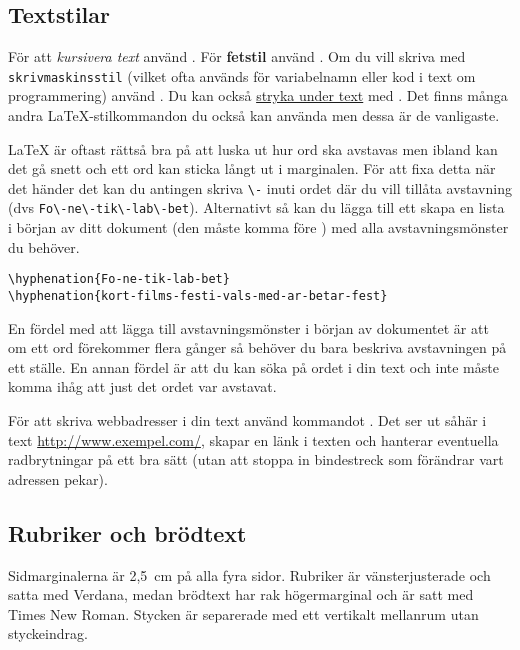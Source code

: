 
\subsection{Textstilar}

För att \emph{kursivera text} använd . För \textbf{fetstil}
använd . Om du vill skriva med \texttt{skriv\-maskins\-stil}
(vilket ofta används för variabelnamn eller kod i text om programmering) använd
. Du kan också \underline{stryka under text} med
. Det finns många andra \LaTeX{}-stilkommandon du också
kan använda men dessa är de vanligaste.

\LaTeX{} är oftast rättså bra på att luska ut hur ord ska avstavas men ibland
kan det gå snett och ett ord kan sticka långt ut i marginalen. För att fixa
detta när det händer det kan du antingen skriva \verb|\-| inuti ordet där du
vill tillåta avstavning (dvs \verb|Fo\-ne\-tik\-lab\-bet|). Alternativt så kan
du lägga till ett skapa en lista i början av ditt dokument (den måste komma
före \verb||) med alla avstavningsmönster du behöver.

\begin{verbatim}
\hyphenation{Fo-ne-tik-lab-bet}
\hyphenation{kort-films-festi-vals-med-ar-betar-fest}
\end{verbatim}

En fördel med att lägga till avstavningsmönster i början av dokumentet är att
om ett ord förekommer flera gånger så behöver du bara beskriva avstavningen på
ett ställe. En annan fördel är att du kan söka på ordet i din text och inte
måste komma ihåg att just det ordet var avstavat.

För att skriva webbadresser i din text använd kommandot . Det
ser ut såhär i text \url{http://www.exempel.com/}, skapar en länk i texten och
hanterar eventuella radbrytningar på ett bra sätt (utan att stoppa in
bindestreck som förändrar vart adressen pekar).


\subsection{Rubriker och brödtext}

Sidmarginalerna är 2,5~cm på alla fyra sidor. Rubriker är vänsterjusterade och
satta med Verdana, medan brödtext har rak högermarginal och är satt med Times
New Roman. Stycken är separerade med ett vertikalt mellanrum utan styckeindrag.

